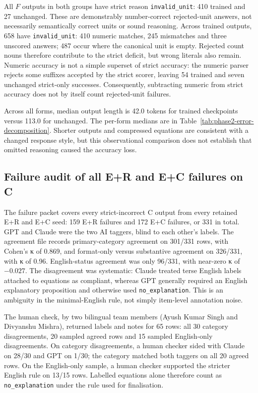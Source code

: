 All $F$ outputs in both groups have strict reason \texttt{invalid\_unit}: 410 trained and 27 unchanged. These are demonstrably number-correct rejected-unit answers, not necessarily semantically correct units or sound reasoning. Across trained outputs, 658 have \texttt{invalid\_unit}: 410 numeric matches, 245 mismatches and three unscored answers; 487 occur where the canonical unit is empty. Rejected count nouns therefore contribute to the strict deficit, but wrong literals also remain. Numeric accuracy is not a simple superset of strict accuracy: the numeric parser rejects some suffixes accepted by the strict scorer, leaving 54 trained and seven unchanged strict-only successes. Consequently, subtracting numeric from strict accuracy does not by itself count rejected-unit failures.

Across all forms, median output length is 42.0 tokens for trained checkpoints versus 113.0 for unchanged. The per-form medians are in Table~\ref{tab:phase2-error-decomposition}. Shorter outputs and compressed equations are consistent with a changed response style, but this observational comparison does not establish that omitted reasoning caused the accuracy loss.

\subsection{Failure audit of all E+R and E+C failures on C}
The failure packet covers every strict-incorrect C output from every retained E+R and E+C seed: 159 E+R failures and 172 E+C failures, or 331 in total. GPT and Claude were the two AI taggers, blind to each other's labels. The agreement file records primary-category agreement on 301/331 rows, with Cohen's κ of 0.869, and format-only versus substantive agreement on 326/331, with κ of 0.96. English-status agreement was only 96/331, with near-zero κ of $-0.027$. The disagreement was systematic: Claude treated terse English labels attached to equations as compliant, whereas GPT generally required an English explanatory proposition and otherwise used \texttt{no\_explanation}. This is an ambiguity in the minimal-English rule, not simply item-level annotation noise.

The human check, by two bilingual team members (Ayush Kumar Singh and Divyanshu Mishra), returned labels and notes for 65 rows: all 30 category disagreements, 20 sampled agreed rows and 15 sampled English-only disagreements. On category disagreements, a human checker sided with Claude on 28/30 and GPT on 1/30; the category matched both taggers on all 20 agreed rows. On the English-only sample, a human checker supported the stricter English rule on 13/15 rows. Labelled equations alone therefore count as \texttt{no\_explanation} under the rule used for finalisation.

